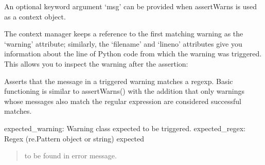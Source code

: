 \documentclass[letterpaper,10pt,english]{sphinxmanual}
\begin{document}
\begin{fulllineitems}
\begin{fulllineitems}
\sphinxAtStartPar
An optional keyword argument ‘msg’ can be provided when assertWarns
is used as a context object.

\sphinxAtStartPar
The context manager keeps a reference to the first matching
warning as the ‘warning’ attribute; similarly, the ‘filename’
and ‘lineno’ attributes give you information about the line
of Python code from which the warning was triggered.
This allows you to inspect the warning after the assertion:

\begin{sphinxVerbatim}[commandchars=\\\{\}]
   
  
 
\end{sphinxVerbatim}

\end{fulllineitems}


\begin{fulllineitems}
\label{\detokenize{_autosummary/tests.test_unit.test_sqlite:tests.test_unit.test_sqlite.assertWarnsRegex}}
\pysigstartsignatures
{}
\pysigstopsignatures
\sphinxAtStartPar
Asserts that the message in a triggered warning matches a regexp.
Basic functioning is similar to assertWarns() with the addition
that only warnings whose messages also match the regular expression
are considered successful matches.
\begin{description}
\sphinxAtStartPar
expected\_warning: Warning class expected to be triggered.
expected\_regex: Regex (re.Pattern object or string) expected
\begin{quote}

\sphinxAtStartPar
to be found in error message.
\end{quote}


\end{description}
\end{fulllineitems}
\end{fulllineitems}
\end{document}

